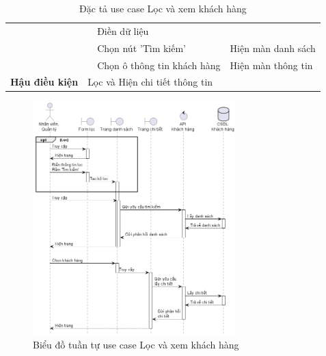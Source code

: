 \documentclass[../DoAn.tex]{subfiles}
\begin{document}
\begin{table}[H]
\begin{tabular}{|l|c|l|l|}
                                                &                                                                           & Điền dữ liệu                            &                                                 \\
                                                &                                                                           & Chọn nút 'Tìm kiếm'                     & Hiện màn danh sách                              \\ \cline{3-4}
                                                &                                                                           & Chọn ô thông tin khách hàng             & Hiện màn thông tin                              \\ \hline
        \textbf{Hậu điều kiện}                  & \multicolumn{3}{l|}{Lọc và Hiện chi tiết thông tin}                                                                                                                   \\ \hline
    \end{tabular}
    \caption{Đặc tả use case Lọc và xem khách hàng}
    \label{table:uc-client-filter}
\end{table}
\begin{figure}[H]
    \centering
    \includegraphics[width=0.7\textwidth]{Hinhve/sequences/ClientFilter.png}
    \caption{Biểu đồ tuần tự use case Lọc và xem khách hàng}
    \label{figure:sd-client-filter}
\end{figure}
\break
\end{document}
